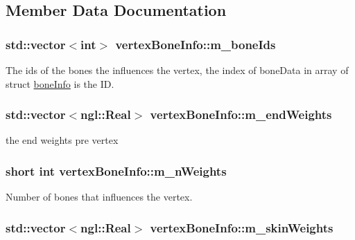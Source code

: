 \subsection{Member Data Documentation}
\hypertarget{structvertex_bone_info_a1c6a7f3c896ef14cfd0d67413b4e6968}{
\subsubsection[{m\-\_\-bone\-Ids}]{\setlength{\rightskip}{0pt plus 5cm}std\-::vector$<$int$>$ vertex\-Bone\-Info\-::m\-\_\-bone\-Ids}}\label{structvertex_bone_info_a1c6a7f3c896ef14cfd0d67413b4e6968}


The ids of the bones the influences the vertex, the index of bone\-Data in array of struct \hyperlink{structbone_info}{bone\-Info} is the I\-D. 

\hypertarget{structvertex_bone_info_a2a6be4f7097e11c758236b20b7961bca}{
\subsubsection[{m\-\_\-end\-Weights}]{\setlength{\rightskip}{0pt plus 5cm}std\-::vector$<$ngl\-::\-Real$>$ vertex\-Bone\-Info\-::m\-\_\-end\-Weights}}\label{structvertex_bone_info_a2a6be4f7097e11c758236b20b7961bca}


the end weights pre vertex 

\hypertarget{structvertex_bone_info_a0cf6fd740dc88b306d45207502aa0cbc}{
\subsubsection[{m\-\_\-n\-Weights}]{\setlength{\rightskip}{0pt plus 5cm}short int vertex\-Bone\-Info\-::m\-\_\-n\-Weights}}\label{structvertex_bone_info_a0cf6fd740dc88b306d45207502aa0cbc}


Number of bones that influences the vertex. 

\hypertarget{structvertex_bone_info_a3f832186c084ce895c7a98fc96bda4a0}{
\subsubsection[{m\-\_\-skin\-Weights}]{\setlength{\rightskip}{0pt plus 5cm}std\-::vector$<$ngl\-::\-Real$>$ vertex\-Bone\-Info\-::m\-\_\-skin\-Weights}}\label{structvertex_bone_info_a3f832186c084ce895c7a98fc96bda4a0}



